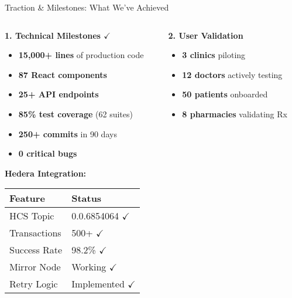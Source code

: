 \documentclass[aspectratio=169,xcolor=dvipsnames,14pt]{beamer}
\newcommand{\checkitem}{\item[\color{SuccessGreen}\faCheckCircle]}
\begin{document}
\begin{frame}{Traction \& Milestones: What We've Achieved}

  \begin{columns}[T]
    \begin{column}{0.5\textwidth}
      \textbf{\textcolor{SuccessGreen}{1. Technical Milestones $\checkmark$}}

      \begin{itemize}
        \checkitem \textbf{15,000+ lines} of production code
        \checkitem \textbf{87 React components}
        \checkitem \textbf{25+ API endpoints}
        \checkitem \textbf{85\% test coverage} (62 suites)
        \checkitem \textbf{250+ commits} in 90 days
        \checkitem \textbf{0 critical bugs}
      \end{itemize}

      \vspace{0.3cm}

      \textbf{Hedera Integration:}
      \begin{table}
        \scriptsize
        \begin{tabular}{ll}
          \toprule
          \textbf{Feature} & \textbf{Status} \\
          \midrule
          HCS Topic & \textcolor{SuccessGreen}{0.0.6854064 $\checkmark$} \\
          Transactions & \textcolor{SuccessGreen}{500+ $\checkmark$} \\
          Success Rate & \textcolor{SuccessGreen}{98.2\% $\checkmark$} \\
          Mirror Node & \textcolor{SuccessGreen}{Working $\checkmark$} \\
          Retry Logic & \textcolor{SuccessGreen}{Implemented $\checkmark$} \\
          \bottomrule
        \end{tabular}
      \end{table}
    \end{column}

    \begin{column}{0.5\textwidth}
      \textbf{\textcolor{SuccessGreen}{2. User Validation}}

      \begin{itemize}
        \checkitem \textbf{3 clinics} piloting
        \checkitem \textbf{12 doctors} actively testing
        \checkitem \textbf{50 patients} onboarded
        \checkitem \textbf{8 pharmacies} validating Rx
      \end{itemize}


\end{column}
\end{columns}
\end{frame}
\end{document}
